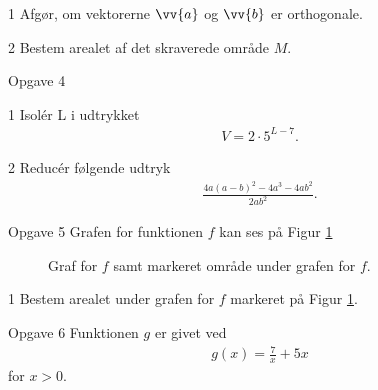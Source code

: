 \begin{delopgave}{1}
	Afgør, om vektorerne $\vv{a}$ og $\vv{b}$ er orthogonale.
\end{delopgave}
\begin{delopgave}{2}
	Bestem arealet af det skraverede område $M$. 
\end{delopgave}
%
%
%
%
%
\begin{opgavetekst}{Opgave 4}
\end{opgavetekst}
\begin{delopgave}{1}
	Isolér L i udtrykket
	\begin{align*}
		V = 2\cdot 5^{L-7}.
	\end{align*}
\end{delopgave}
\begin{delopgave}{2}
	Reducér følgende udtryk
	\begin{align*}
		\frac{4a(a-b)^2 - 4a^3 - 4ab^2}{2ab^2}.
	\end{align*}
\end{delopgave}
%
%
%
%
%
\begin{opgavetekst}{Opgave 5}
	Grafen for funktionen $f$ kan ses på Figur \ref{fig:areal}
	\begin{figure}[H]
		\centering
		\caption{Graf for $f$ samt markeret område under grafen for $f$.}
		\label{fig:areal}
	\end{figure}
	\phantom{h}
\end{opgavetekst}
\begin{delopgave}{1}
	Bestem arealet under grafen for $f$ markeret på Figur \ref{fig:areal}.
\end{delopgave}
%
%
%
%
%
\begin{opgavetekst}{Opgave 6}
	Funktionen $g$ er givet ved
	\begin{align*}
		g(x) = \frac{7}{x} + 5x
	\end{align*}
	for $x > 0$. 
\end{opgavetekst}
